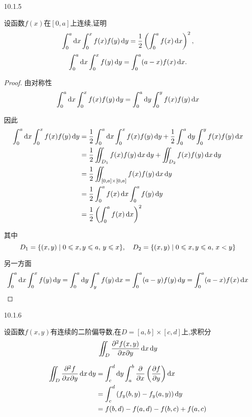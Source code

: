 \begin{exercise}
    {10.1.5}

    设函数$f(x)$在$[0,a]$上连续,证明
    $$
    \int_0^a \operatorname{d\!} x \int_0^x f(x)f(y) \operatorname{d\!} y = \frac12 \left( \int_0^a f(x) \operatorname{d\!} x \right)^2,
    $$
    $$
    \int_0^a \operatorname{d\!} x \int_0^x f(y) \operatorname{d\!} y = \int_0^a (a-x) f(x) \operatorname{d\!} x.
    $$
\end{exercise}

\begin{proof}
    由对称性
\[
\int_0^a \operatorname{d\!} x \int_0^x f(x)f(y) \operatorname{d\!} y = \int_0^a \operatorname{d\!} y \int_0^y f(x)f(y) \operatorname{d\!} x
\]

因此
\begin{align*}
\int_0^a \dif x \int_0^x f(x)f(y) \dif y 
&= \frac{1}{2} \int_0^a \dif x \int_0^x f(x)f(y) \dif y 
+ \frac{1}{2} \int_0^a \dif y \int_0^y f(x)f(y) \dif x \\
&= \frac{1}{2} \iint_{D_1} f(x)f(y) \dif x \dif y + \iint_{D_2} f(x)f(y) \dif x \dif y \\
&= \frac{1}{2} \iint_{[0,a] \times [0,a]} f(x)f(y) \dif x \dif y \\
&= \frac{1}{2} \int_0^a f(x) \dif x \int_0^a f(y) \dif y \\
&= \frac{1}{2} \left( \int_0^a f(x) \dif x \right)^2
\end{align*}

其中
\[
D_1 = \{ (x, y) \mid 0 \leqslant x, y \leqslant a,\, y \leqslant x \}, \quad
D_2 = \{ (x, y) \mid 0 \leqslant x, y \leqslant a,\, x < y \}
\]

另一方面
\[
\int_0^a \operatorname{d\!} x \int_0^x f(y) \operatorname{d\!} y 
= \int_0^a \operatorname{d\!} y \int_y^a f(y) \operatorname{d\!} x 
= \int_0^a (a - y)f(y) \operatorname{d\!} y 
= \int_0^a (a - x)f(x) \operatorname{d\!} x
\]
\end{proof}

\begin{exercise}
    {10.1.6}

    设函数$f(x,y)$有连续的二阶偏导数,在$D=[a,b]\times [c,d]$上,求积分
    $$
    \iint_D \pdv{f(x,y)}{x}{y} \dif x \dif y
    $$
\end{exercise}

\begin{solution}
    \begin{align*}
        \iint_D \pdv[2]{f}{x}{y} \dif x \dif y &= \int_c^d \dif y \int_a^b \pdv{}{x} \left( \pdv{f}{y} \right) \dif x \\
&= \int_c^d \left( f_y(b, y) - f_y(a, y) \right) \dif y\\
&= f(b,d) -f(a,d) - f(b,c) + f(a,c)
    \end{align*}
\end{solution}


